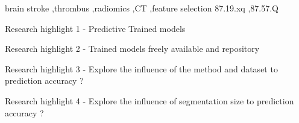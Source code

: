 \documentclass[preprint,12pt]{elsarticle}
\begin{document}
\begin{frontmatter}
\begin{abstract}
Background and Objectives
Methods
Results
Conclusions

\end{abstract}

\begin{graphicalabstract}
\end{graphicalabstract}

\begin{keyword}
brain stroke \sep thrombus \sep radiomics \sep CT \sep feature selection
87.19.xq \sep 87.57.Q

\end{keyword}

\begin{highlights} %
\item Research highlight 1 - Predictive Trained models
\item Research highlight 2 - Trained models freely available and repository
\item Research highlight 3 - Explore the influence of the method and dataset to prediction accuracy ?
\item Research highlight 4 - Explore the influence of segmentation size to prediction accuracy ?
\end{highlights}


\end{frontmatter}

\end{document}
